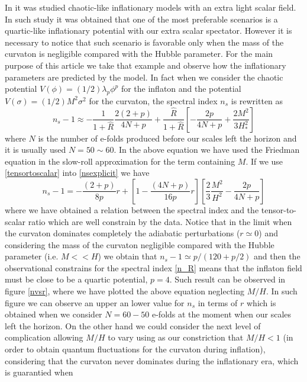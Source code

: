 \documentclass[amssymb,twocolumn,prd,nofootinbib,showpacs]{revtex4-1}
\begin{document}
In \cite{curvaton15} it was studied chaotic-like inflationary models with an extra light scalar field. In such study it was obtained that one of the most preferable scenarios is a quartic-like inflationary potential with our extra scalar spectator. However it is necessary to notice that such scenario is favorable only when the mass of the curvaton is negligible compared with the Hubble parameter. For the main purpose of this article we take that example and observe how the inflationary parameters are predicted by the model. In fact when we consider the chaotic potential $V(\phi)=(1/2)\lambda_p\phi^p$ for the inflaton and the  potential $V(\sigma)= (1/2)M^2\sigma^2$ for the curvaton, the spectral index $n_s$ is rewritten as
\begin{equation}
\label{nsexplicit}
n_s-1\approx -\frac{1}{1+\hat R}\frac{2(2+p)}{4N+p}+\frac{\hat R}{1+\hat R}\left[-\frac{2p}{4N+p}+\frac{2M^2}{3H_*^2}\right]
\end{equation}
where  $N$ is the number of e-folds produced before our scales left the horizon and it is usually used $N=50\sim 60$. In the above equation we have used the Friedman equation in the slow-roll approximation for the term containing $M$. If we use \eqref{tensortoscalar} into \eqref{nsexplicit} we have 
\begin{equation}
n_s-1=-\frac{(2+p)}{8p}r+\left[1-\frac{(4N+p)}{16p}r\right]\left[\frac{2}{3}\frac{M^2}{H^2}-\frac{2p}{4N+p}\right]
\end{equation}
where we have obtained a relation between the spectral index and the tensor-to-scalar ratio which are well constrain by the data. Notice that in the limit when the curvaton dominates completely the adiabatic perturbations ($r\simeq 0$) and considering the mass of the curvaton negligible compared with the Hubble parameter (i.e. $M<<H$) we obtain that $n_s-1\simeq p/(120+p/2)$ and then the observational constrains for the spectral index \eqref{n_R} means that the inflaton field must be close to be a quartic potential, $p=4$. Such result can be observed in figure \ref{nvsr}, where we have plotted the above equation neglecting $M/H$. In such figure we can observe an upper an lower value for $n_s$ in terms of $r$ which is obtained when we consider $N=60-50$ e-folds at the moment when our scales left the horizon. On the other hand we could consider the next level of complication allowing $M/H$ to vary using as our constriction that $M/H<1$ (in order to obtain quantum fluctuations for the curvaton during inflation), considering that the curvaton never dominates during the inflationary era, which is guarantied when
\end{document}
